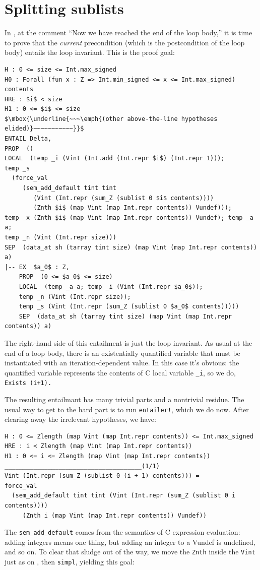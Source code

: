 \documentclass[12pt,fleqn,openany,oneside,showtrims]{memoir}
\begin{document}
\chapter{Splitting sublists}
In , at the comment ``Now we have reached
the end of the loop body,'' it is time to prove that the \emph{current}
precondition (which is the postcondition of the loop body) entails
the loop invariant.  This is the proof goal:
\begin{lstlisting}
H : 0 <= size <= Int.max_signed
H0 : Forall (fun x : Z => Int.min_signed <= x <= Int.max_signed) contents
HRE : $i$ < size
H1 : 0 <= $i$ <= size
$\mbox{\underline{~~~\emph{(other above-the-line hypotheses elided)}~~~~~~~~~~~}}$
ENTAIL Delta,
PROP  ()
LOCAL  (temp _i (Vint (Int.add (Int.repr $i$) (Int.repr 1)));
temp _s
  (force_val
     (sem_add_default tint tint
        (Vint (Int.repr (sum_Z (sublist 0 $i$ contents))))
        (Znth $i$ (map Vint (map Int.repr contents)) Vundef)));
temp _x (Znth $i$ (map Vint (map Int.repr contents)) Vundef); temp _a a;
temp _n (Vint (Int.repr size)))
SEP  (data_at sh (tarray tint size) (map Vint (map Int.repr contents)) a)
|-- EX  $a_0$ : Z,
    PROP  (0 <= $a_0$ <= size)
    LOCAL  (temp _a a; temp _i (Vint (Int.repr $a_0$));
    temp _n (Vint (Int.repr size));
    temp _s (Vint (Int.repr (sum_Z (sublist 0 $a_0$ contents)))))
    SEP  (data_at sh (tarray tint size) (map Vint (map Int.repr contents)) a)
\end{lstlisting}
The right-hand side of this entailment is just the loop invariant.
As usual at the end of a loop body, there is an existentially
quantified variable that must be instantiated with an iteration-dependent value.
In this case it's obvious: the quantified variable represents the
contents of C local variable \lstinline{_i}, so we do,
\lstinline{Exists (i+1).}

The resulting entailmant has many trivial parts and a nontrivial residue.
The usual way to get to the hard part is to run \lstinline{entailer!},
which we do now.  After clearing away the irrelevant hypotheses, we have:

\begin{lstlisting}
H : 0 <= Zlength (map Vint (map Int.repr contents)) <= Int.max_signed
HRE : i < Zlength (map Vint (map Int.repr contents))
H1 : 0 <= i <= Zlength (map Vint (map Int.repr contents))
______________________________________(1/1)
Vint (Int.repr (sum_Z (sublist 0 (i + 1) contents))) =
force_val
  (sem_add_default tint tint (Vint (Int.repr (sum_Z (sublist 0 i contents))))
     (Znth i (map Vint (map Int.repr contents)) Vundef))
\end{lstlisting}
The \lstinline{sem_add_default} comes from the semantics of C
expression evaluation:  adding integers means one thing,
but adding an integer to a Vundef is undefined, and so on.
To clear that sludge out of the way, we
move the \lstinline{Znth} inside the \lstinline{Vint} just
as on ,
then \lstinline{simpl}, yielding this goal:
\end{document}
